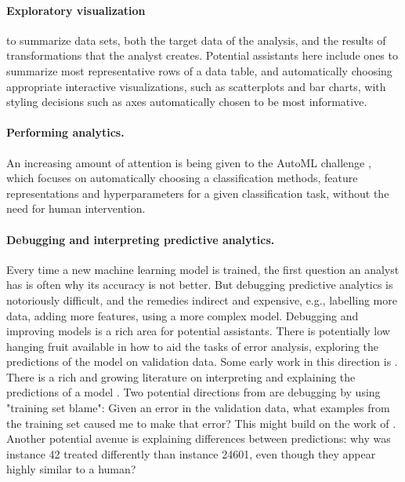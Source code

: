 \documentclass[sigplan,preprint,10pt]{acmart}\settopmatter{printfolios=true,printccs=false,printacmref=false}
\begin{document}
{{\paragraph{Exploratory visualization} to summarize
data sets, both the target data of the analysis,
and the results of transformations that the analyst
creates. Potential assistants here include ones
to summarize most representative rows of a data table,
and automatically choosing appropriate interactive
visualizations, such as scatterplots and bar charts,
with styling decisions such as axes automatically
chosen to be most informative.

\paragraph{Performing analytics.}
An increasing amount of attention is being
given to the AutoML challenge \cite{guyon_review_2016}, which focuses
on automatically choosing a classification
methods, feature representations and hyperparameters
for a given classification task, without the need for human intervention.

\paragraph{Debugging and interpreting predictive analytics.}
Every time a new machine learning model is trained, the first question
an analyst has is often why its accuracy is not better. But debugging
predictive analytics is notoriously difficult, and the remedies
indirect and expensive, e.g., labelling more data, adding more
features, using a more complex model. Debugging and improving models
is a rich area for potential assistants.  There is potentially low
hanging fruit available in how to aid the tasks of error analysis,
exploring the predictions of the model on validation data. Some early
work in this direction is \cite{saleema}.  There is a rich and growing
literature on interpreting and explaining the predictions of a model
\cite{lipton:mythos,doshi-velez17,ribiero2016lime,darksight}.  Two
potential directions from are debugging by using "training set
blame": Given an error in the validation data, what examples from the
training set caused me to make that error? This might build on the
work of \cite{percy}.  Another potential avenue is explaining
differences between predictions: why was instance 42 treated
differently than instance 24601, even though they appear highly
similar to a human?  }

\begin{comment}

\end{comment}}
\end{document}

